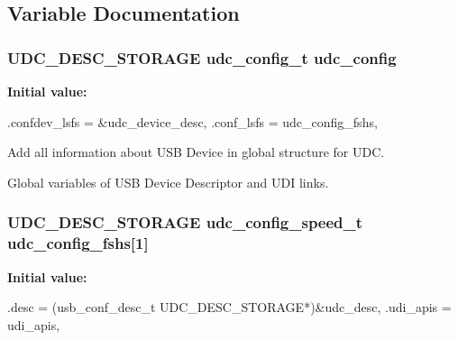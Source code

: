 \subsection{\-Variable \-Documentation}
\hypertarget{group__udi__cdc__group__desc_ga40ae5a61fbfa7e289136b2f9fd190217}{
\subsubsection[{udc\-\_\-config}]{\setlength{\rightskip}{0pt plus 5cm}\-U\-D\-C\-\_\-\-D\-E\-S\-C\-\_\-\-S\-T\-O\-R\-A\-G\-E {\bf udc\-\_\-config\-\_\-t} {\bf udc\-\_\-config}}}
\label{group__udi__cdc__group__desc_ga40ae5a61fbfa7e289136b2f9fd190217}
{\bfseries \-Initial value\-:}
\begin{DoxyCode}
 {
        .confdev_lsfs = &udc_device_desc,
        .conf_lsfs = udc_config_fshs,





}
\end{DoxyCode}


\-Add all information about \-U\-S\-B \-Device in global structure for \-U\-D\-C. 

\-Global variables of \-U\-S\-B \-Device \-Descriptor and \-U\-D\-I links. \hypertarget{group__udi__cdc__group__desc_ga75bec31a56e1233cbb933ce3391429b2}{
\subsubsection[{udc\-\_\-config\-\_\-fshs}]{\setlength{\rightskip}{0pt plus 5cm}\-U\-D\-C\-\_\-\-D\-E\-S\-C\-\_\-\-S\-T\-O\-R\-A\-G\-E {\bf udc\-\_\-config\-\_\-speed\-\_\-t} {\bf udc\-\_\-config\-\_\-fshs}\mbox{[}1\mbox{]}}}
\label{group__udi__cdc__group__desc_ga75bec31a56e1233cbb933ce3391429b2}
{\bfseries \-Initial value\-:}
\begin{DoxyCode}
 { {
        .desc          = (usb_conf_desc_t UDC_DESC_STORAGE*)&udc_desc,
        .udi_apis = udi_apis,
}}
\end{DoxyCode}


